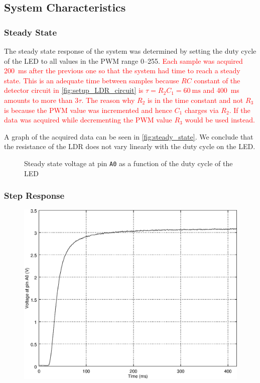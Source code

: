 \subsection{System Characteristics}
\label{sec:SystemCharacteristics}

\subsubsection{Steady State}
\label{sub:SteadyState}

The steady state response of the system was determined by setting the duty cycle of the LED to all values in the PWM range 0--255. \textcolor{red}{Each sample was acquired \SI{200}{\milli\second} after the previous one so that the system had time to reach a steady state. This is an adequate time between samples because $RC$ constant of the detector circuit in \autoref{fig:setup_LDR_circuit} is $\tau = R_2C_1 = \SI{60}{\milli\second}$ and \SI{400}{\milli\second} amounts to more than $3\tau$. The reason why $R_2$ is in the time constant and not $R_3$ is because the PWM value was incremented and hence $C_1$ charges via $R_2$. If the data was acquired while decrementing the PWM value $R_3$ would be used instead.}


A graph of the acquired data can be seen in \autoref{fig:steady_state}. We conclude that the resistance of the LDR does not vary linearly with the duty cycle on the LED.

\begin{figure}[h]
    \centering
    \resizebox{\textwidth}{!}{}
    \caption{Steady state voltage at pin \texttt{A0} as a function of the duty cycle of the LED}
    \label{fig:steady_state}
\end{figure}

\subsubsection{Step Response}
\label{sub:StepResponse}



\begin{figure}[h]
    \centering
    \includegraphics[width=.85\textwidth]{img/step_response}
    \caption{}
    \label{fig:step_response}
\end{figure}

